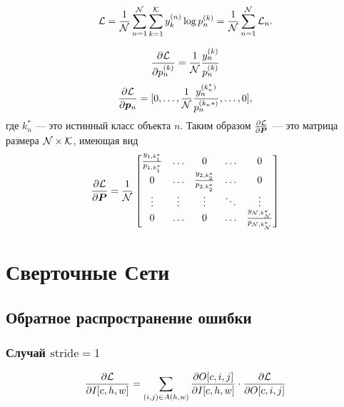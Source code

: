 \documentclass{report}
\numberwithin{theorem}{chapter}
\numberwithin{statement}{chapter}
\numberwithin{lemma}{chapter}
\theoremstyle{definition}
\numberwithin{task}{chapter}
\theoremstyle{remark}
\numberwithin{example}{chapter}
\theoremstyle{definition}
\numberwithin{definition}{chapter}
\theoremstyle{remark}
\theoremstyle{remark}
\numberwithin{lyrics}{section}
\begin{document}
\begin{gather*}
\mathcal{L} = \frac{1}{\mathcal{N}} \sum\limits_{n = 1}^{\mathcal{N}} \sum\limits_{k = 1}^{\mathcal{K}} y_k^{(n)} \log p_n^{(k)} = \frac{1}{\mathcal{N}} \sum\limits_{n=1}^{\mathcal{N}} \mathcal{L}_n.
\end{gather*}

\begin{gather*}
\frac{\partial \mathcal{L} }{\partial p_n^{(k)}} = \frac{1}{\mathcal{N}} \frac{y_n^{(k)}}{p_n^{(k)}}
\end{gather*}
\begin{gather*}
\frac{\partial \mathcal{L} }{\partial \boldsymbol{p}_n} = [0, \dots,  \frac{1}{\mathcal{N}} \frac{y_n^{(k_n^*)}}{p_n^{(k_n*)}}, \dots, 0], 
\end{gather*}
где $k_n^*$ --- это истинный класс объекта $n$. Таким образом $\frac{\partial \mathcal{L} }{\partial \boldsymbol{P}}$ --- это матрица размера $\mathcal{N} \times \mathcal{K}$, имеющая вид
\begin{gather*}
\frac{\partial \mathcal{L} }{\partial \boldsymbol{P}} = \frac{1}{\mathcal{N}}
\begin{bmatrix}
\frac{y_{1, k^*_1}}{p_{1, k^*_1}} &\dots  &0 &\dots  &0 \\
0 &\dots  &\frac{y_{2, k^*_2}}{p_{2, k^*_2}} &\dots  &0 \\
\vdots &\vdots  &\vdots &\ddots  &\vdots \\
0 &\dots  &0 &\dots  &\frac{y_{\mathcal{N}, k^*_{\mathcal{N}}}}{p_{\mathcal{N}, k^*_{\mathcal{N}}}} \\
\end{bmatrix}
\end{gather*}

\chapter{Сверточные Сети}

\section{Обратное распространение ошибки}

\subsection{Случай $\text{stride} = 1$}

\begin{equation}
\frac{\partial \mathcal{L} }{\partial I[c, h, w]}= \sum\limits_{(i, j) \in A(h, w)} 
\frac{\partial O[c, i, j] }{\partial I[c, h, w]} \cdot \frac{\partial \mathcal{L} }{\partial O[c, i, j]}
\end{equation}
\end{document}
